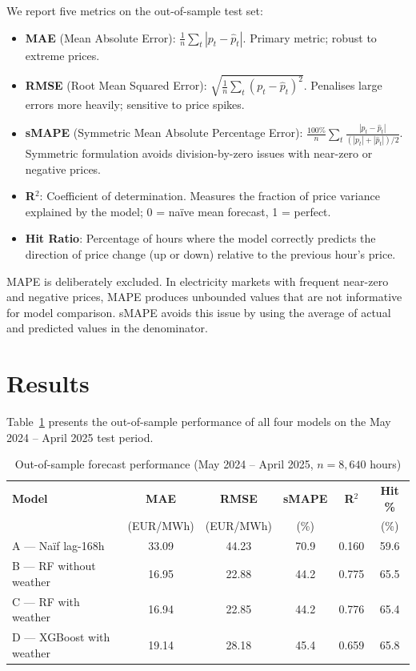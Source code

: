 We report five metrics on the out-of-sample test set:

\begin{itemize}
  \item \textbf{MAE} (Mean Absolute Error): $\frac{1}{n}\sum_t |p_t - \hat{p}_t|$. Primary metric; robust to extreme prices.
  \item \textbf{RMSE} (Root Mean Squared Error): $\sqrt{\frac{1}{n}\sum_t (p_t - \hat{p}_t)^2}$. Penalises large errors more heavily; sensitive to price spikes.
  \item \textbf{sMAPE} (Symmetric Mean Absolute Percentage Error): $\frac{100\%}{n}\sum_t \frac{|p_t - \hat{p}_t|}{(|p_t| + |\hat{p}_t|)/2}$. Symmetric formulation avoids division-by-zero issues with near-zero or negative prices.
  \item \textbf{R$^2$}: Coefficient of determination. Measures the fraction of price variance explained by the model; 0 = na\"{i}ve mean forecast, 1 = perfect.
  \item \textbf{Hit Ratio}: Percentage of hours where the model correctly predicts the direction of price change (up or down) relative to the previous hour's price.
\end{itemize}

MAPE is deliberately excluded. In electricity markets with frequent near-zero and negative prices, MAPE produces unbounded values that are not informative for model comparison. sMAPE avoids this issue by using the average of actual and predicted values in the denominator.

\section{Results}

Table~\ref{tab:model_results} presents the out-of-sample performance of all four models on the May 2024 -- April 2025 test period.

\begin{table}[H]
  \centering
  \caption{Out-of-sample forecast performance (May 2024 -- April 2025, $n = 8{,}640$ hours)}
  \label{tab:model_results}
  \begin{tabular}{lccccc}
    \toprule
    \textbf{Model} & \textbf{MAE} & \textbf{RMSE} & \textbf{sMAPE} & \textbf{R$^2$} & \textbf{Hit \%} \\
    & (EUR/MWh) & (EUR/MWh) & (\%) & & (\%) \\
    \midrule
    A — Na\"{i}f lag-168h       & 33.09 & 44.23 & 70.9 & 0.160 & 59.6 \\
    B — RF without weather  & 16.95 & 22.88 & 44.2 & 0.775 & 65.5 \\
    C — RF with weather     & 16.94 & 22.85 & 44.2 & 0.776 & 65.4 \\
    D — XGBoost with weather & 19.14 & 28.18 & 45.4 & 0.659 & 65.8 \\
    \bottomrule
  \end{tabular}
\end{table}

